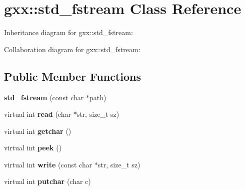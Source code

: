 \hypertarget{classgxx_1_1std__fstream}{}\section{gxx\+:\+:std\+\_\+fstream Class Reference}
\label{classgxx_1_1std__fstream}


Inheritance diagram for gxx\+:\+:std\+\_\+fstream\+:


Collaboration diagram for gxx\+:\+:std\+\_\+fstream\+:
\subsection*{Public Member Functions}
\begin{DoxyCompactItemize}
\item 
{\bfseries std\+\_\+fstream} (const char $\ast$path)\hypertarget{classgxx_1_1std__fstream_a0bec88efcd4286a42d336a64c1011070}{}\label{classgxx_1_1std__fstream_a0bec88efcd4286a42d336a64c1011070}

\item 
virtual int {\bfseries read} (char $\ast$str, size\+\_\+t sz)\hypertarget{classgxx_1_1std__fstream_a888345fafad188edc54d793a3f63a0f9}{}\label{classgxx_1_1std__fstream_a888345fafad188edc54d793a3f63a0f9}

\item 
virtual int {\bfseries getchar} ()\hypertarget{classgxx_1_1std__fstream_a0d159ca73a928f4a77eaab8c21e7d871}{}\label{classgxx_1_1std__fstream_a0d159ca73a928f4a77eaab8c21e7d871}

\item 
virtual int {\bfseries peek} ()\hypertarget{classgxx_1_1std__fstream_a3487b1cf7d3612424b83514fe41102be}{}\label{classgxx_1_1std__fstream_a3487b1cf7d3612424b83514fe41102be}

\item 
virtual int {\bfseries write} (const char $\ast$str, size\+\_\+t sz)\hypertarget{classgxx_1_1std__fstream_a0bc7665bace5f5bf7ba056969637aec7}{}\label{classgxx_1_1std__fstream_a0bc7665bace5f5bf7ba056969637aec7}

\item 
virtual int {\bfseries putchar} (char c)\hypertarget{classgxx_1_1std__fstream_a280ac3d7330d55b4f7cbb837d2260a2f}{}\label{classgxx_1_1std__fstream_a280ac3d7330d55b4f7cbb837d2260a2f}

\end{DoxyCompactItemize}
